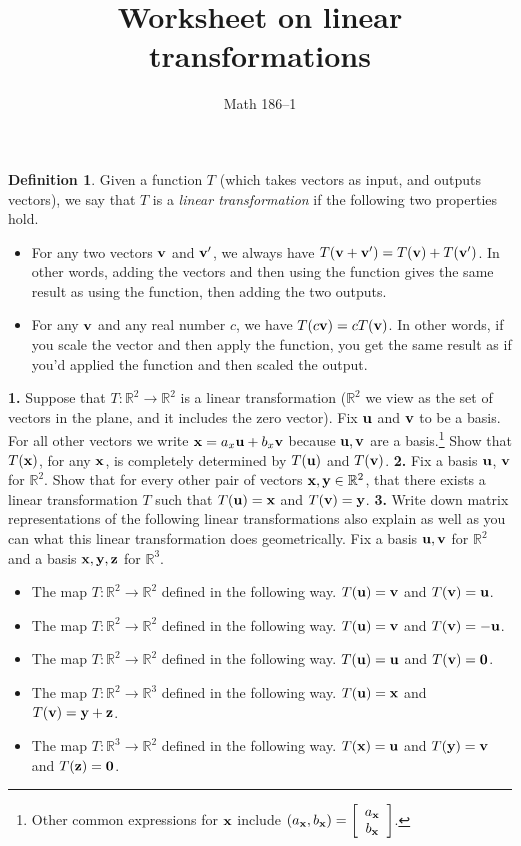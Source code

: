 \documentclass[12pt,twoside,fullpage]{amsart}
\renewcommand{\u}{{\bf{u}}}
\renewcommand{\v}{{\bf{v}}}
\newcommand{\x}{{\bf{x}}}
\newcommand{\y}{{\bf{y}}}
\newcommand{\z}{{\bf{z}}}
\newcommand{\0}{{\bf{0}}}
\newcommand{\bR}{\mathbb{R}}
\theoremstyle{definition}
\newtheorem{definition}[theorem]{Definition}
\theoremstyle{remark}
\begin{document}
\title{Worksheet on linear transformations}
\author{Math 186--1}
\maketitle

\begin{definition}Given a function $T$ (which takes vectors as input, and outputs vectors), we say that $T$ is a \emph{linear transformation} if the following two properties hold.
    \begin{itemize}
    \item[(\#1)]  For any two vectors ${\bf v}$ and ${\bf v'}$, we always have $T({\bf v + v'}) = T({\bf v}) + T({\bf v'})$.  In other words, adding the vectors and then using the function gives the same result as using the function, then adding the two outputs.
    \item[(\#2)]  For any ${\bf v}$ and any real number $c$, we have $T(c {\bf v}) = c T({\bf v})$.  In other words, if you scale the vector and then apply the function, you get the same result as if you'd applied the function and then scaled the output.
    \end{itemize}
\end{definition}
\vskip 12pt
\hskip -12pt
{\bf 1.}  Suppose that $T : \bR^2 \to \bR^2$ is a linear transformation ($\bR^2$ we view as the set of vectors in the plane, and it includes the zero vector).  Fix $\u$ and $\v$ to be a basis.  For all other vectors we write $\x = a_x \u + b_x \v$ because $\u, \v$ are a basis.\footnote{Other common expressions for $\x$ include $(a_\x, b_\x) = \left[ \begin{array}{c} a_\x\\b_\x \end{array}\right]$.}  Show that $T(\x)$, for any $\x$, is completely determined by $T(\u)$ and $T(\v)$.  
\vskip 175pt
\hskip -12pt
{\bf 2.}  Fix a basis $\u$, $\v$ for $\bR^2$.  Show that for every other pair of vectors $\x, \y \in \bR^2$, that there exists a linear transformation $T$ such that $T(\u) = \x$ and $T(\v) = \y$.  
\newpage
\hskip -12pt
{\bf 3.}  Write down matrix representations of the following linear transformations also explain as well as you can what this linear transformation does geometrically.  Fix a basis $\u, \v$ for $\bR^2$ and a basis $\x, \y, \z$ for $\bR^3$.  
\begin{itemize}
 \item[(a)]  The map $T : \bR^2 \to \bR^2$ defined in the following way.  $T(\u) = \v$ and $T(\v) = \u$.
\vskip 140pt
 \item[(b)]  The map $T : \bR^2 \to \bR^2$ defined in the following way.  $T(\u) = \v$ and $T(\v) = -\u$.    
\vskip 140pt
 \item[(c)]  The map $T : \bR^2 \to \bR^2$ defined in the following way.  $T(\u) = \u$ and $T(\v) = \0$.   
\vskip 140pt
 \item[(d)]  The map $T : \bR^2 \to \bR^3$ defined in the following way.  $T(\u) = \x$ and $T(\v) = \y + \z$.  
\vskip 140pt
 \item[(e)]  The map $T : \bR^3 \to \bR^2$ defined in the following way.  $T(\x) = \u$ and $T(\y) = \v$ and $T(\z) = \0$.
\end{itemize}
\end{document}
